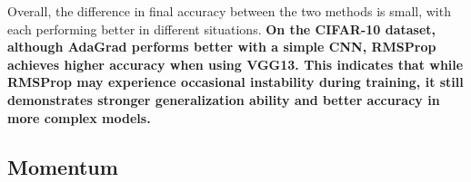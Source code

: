 \documentclass[12pt]{article}
\begin{document}
Overall, the difference in final accuracy between the two methods is small, with each performing better in different situations. \textbf{On the CIFAR-10 dataset, although AdaGrad performs better with a simple CNN, RMSProp achieves higher accuracy when using VGG13. This indicates that while RMSProp may experience occasional instability during training, it still demonstrates stronger generalization ability and better accuracy in more complex models.}


\subsection{Momentum}


\begin{figure}[htbp]
    \centering
     \quad
     \\
     \quad

\end{figure}
\end{document}
